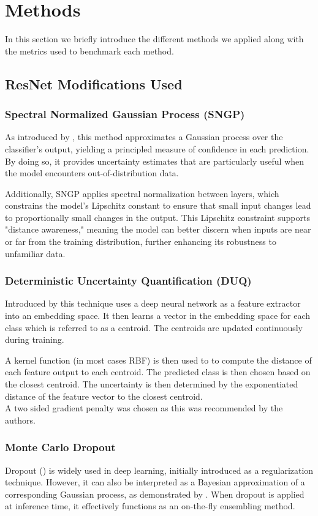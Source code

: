 \documentclass{article}
\begin{document}
\section{Methods}
In this section we briefly introduce the different methods we applied along with the metrics used to benchmark each method. 
\subsection{ResNet Modifications Used}
\subsubsection*{Spectral Normalized Gaussian Process (SNGP)} 
As introduced by \cite{liu2020simpleprincipleduncertaintyestimation}, this method approximates a Gaussian process over the classifier’s output, yielding a principled measure of confidence in each prediction. By doing so, it provides uncertainty estimates that are particularly useful when the model encounters out-of-distribution data.

Additionally, SNGP applies spectral normalization between layers, which constrains the model’s Lipschitz constant to ensure that small input changes lead to proportionally small changes in the output. This Lipschitz constraint supports "distance awareness," meaning the model can better discern when inputs are near or far from the training distribution, further enhancing its robustness to unfamiliar data.

\subsubsection*{Deterministic Uncertainty Quantification (DUQ)}  
Introduced by \cite{duq} this technique uses a deep neural network as a feature extractor into an embedding space. It then learns a vector in the embedding space for each class which is referred to as a centroid. The centroids are updated continuously during training. 

A kernel function (in most cases RBF) is then used to to compute the distance of each feature output to each centroid. The predicted class is then chosen based on the closest centroid. The uncertainty is then determined by the exponentiated distance of the feature vector to the closest centroid. 
\\
A two sided gradient penalty was chosen as this was recommended by the authors. 

\subsubsection*{Monte Carlo Dropout} 
Dropout (\cite{JMLR:v15:srivastava14a}) is widely used in deep learning, initially introduced as a regularization technique. However, it can also be interpreted as a Bayesian approximation of a corresponding Gaussian process, as demonstrated by \cite{pmlr-v48-gal16}. When dropout is applied at inference time, it effectively functions as an on-the-fly ensembling method.
\end{document}
